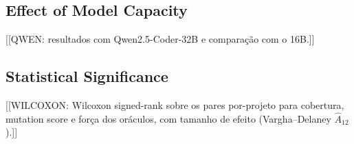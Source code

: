 \subsection{Effect of Model Capacity}
\label{sec:model-capacity}

[[QWEN: resultados com Qwen2.5-Coder-32B e comparação com o 16B.]]

\subsection{Statistical Significance}

[[WILCOXON: Wilcoxon signed-rank sobre os pares por-projeto para cobertura,
mutation score e força dos oráculos, com tamanho de efeito (Vargha--Delaney
$\hat{A}_{12}$).]]
